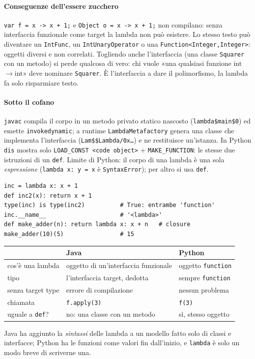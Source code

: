 \documentclass[a4paper,12pt]{article}
\begin{document}
\paragraph{Conseguenze dell'essere zucchero} \texttt{var f = x -> x + 1;} e
\texttt{Object o = x -> x + 1;} non compilano: senza interfaccia funzionale come target la lambda
non può esistere. Lo stesso testo può diventare un \texttt{IntFunc}, un
\texttt{IntUnaryOperator} o una \texttt{Function<Integer,Integer>}: oggetti diversi e non
correlati. Togliendo anche l'interfaccia (una classe \texttt{Squarer} con un metodo) si perde
qualcosa di vero: chi vuole «una qualsiasi funzione int$\to$int» deve nominare
\texttt{Squarer}. È l'interfaccia a dare il polimorfismo, la lambda fa solo risparmiare testo.

\paragraph{Sotto il cofano} \texttt{javac} compila il corpo in un metodo privato statico
nascosto (\texttt{lambda\$main\$0}) ed emette \texttt{invokedynamic}; a runtime
\texttt{LambdaMetafactory} genera una classe che implementa l'interfaccia (\texttt{Lam\$\$Lambda/0x\dots})
e ne restituisce un'istanza. In Python \texttt{dis} mostra solo \texttt{LOAD\_CONST <code
object>} + \texttt{MAKE\_FUNCTION}: le stesse due istruzioni di un \texttt{def}. Limite di
Python: il corpo di una lambda è una sola \emph{espressione} (\texttt{lambda x: y = x} è
\texttt{SyntaxError}); per altro si usa \texttt{def}.
\begin{verbatim}
inc = lambda x: x + 1
def inc2(x): return x + 1
type(inc) is type(inc2)          # True: entrambe 'function'
inc.__name__                     # '<lambda>'
def make_adder(n): return lambda x: x + n   # closure
make_adder(10)(5)                # 15
\end{verbatim}
\begin{center}
\small
\begin{tabular}{|l|l|l|}
\hline
 & \textbf{Java} & \textbf{Python} \\
\hline
cos'è una lambda & oggetto di un'interfaccia funzionale & oggetto \texttt{function} \\
tipo & l'interfaccia target, dedotta & sempre \texttt{function} \\
senza target type & errore di compilazione & nessun problema \\
chiamata & \texttt{f.apply(3)} & \texttt{f(3)} \\
uguale a \texttt{def}? & no: una classe con un metodo & sì, stesso oggetto \\
\hline
\end{tabular}
\end{center}
Java ha aggiunto la \emph{sintassi} delle lambda a un modello fatto solo di classi e
interfacce; Python ha le funzioni come valori fin dall'inizio, e \texttt{lambda} è solo un
modo breve di scriverne una.
\end{document}
